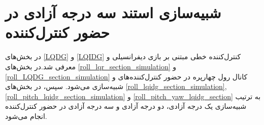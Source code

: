 \chapter{شبیه‌سازی استند سه درجه آزادی در حضور کنترل‌کننده}\label{MIL}
در بخش‌های
\ref{LQDG}
و
\ref{LQIDG}
کنترل‌کننده خطی مبتنی بر بازی دیفرانسیلی  و  معرفی شد.در بخش‌های
\ref{roll_lqr_section_simulation}
و
\ref{roll_LQDG_section_simulation}
کانال 	رول چهارپره در حضور کنترل‌کننده‌های  و
شبیه‌سازی می‌شود. سپس، در بخش‌های
\ref{roll_lqidg_section_simulation},
\ref{roll_pitch_lqidg_section_simulation}
و
\ref{roll_pitch_yaw_lqidg_section}
به‌ ترتیب شبیه‌سازی یک درجه آزادی، دو درجه آزادی و سه درجه آزادی در حضور کنترل‌کننده‌  انجام می‌شود.
